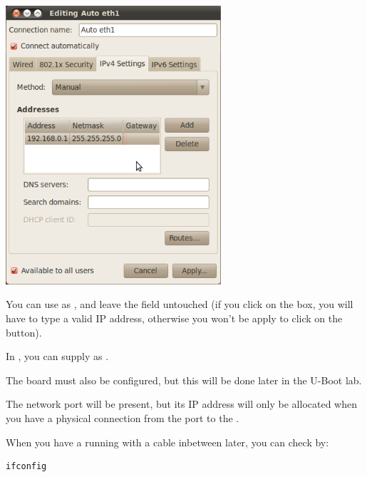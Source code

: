 \begin{center}
\includegraphics[width=8cm]{labs/setup-network/network-config-3.png}
\end{center}

You can use  as , and leave the
 field untouched (if you click on the  box, you
will have to type a valid IP address, otherwise you won't be apply to
click on the  button).

In , you can supply  as .

The board must also be configured, but this will be done later in the U-Boot lab.

The network port will be present, but its IP address will only be allocated when
you have a physical connection from the port to the \devboard.

When you have a running \devboard with a cable inbetween later, you can check by:

\begin{verbatim}
ifconfig
\end{verbatim}

